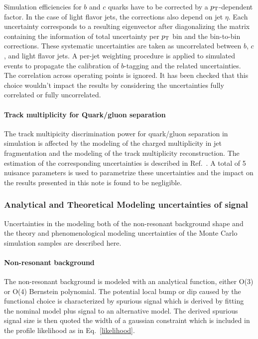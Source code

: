 Simulation efficiencies for $b$ and $c$ quarks have to be corrected by a
$p_{{\rm T}}$-dependent factor. In the case of light flavor jets, the corrections also 
depend on jet $\eta$. 
Each uncertainty corresponds to a resulting eigenvector after diagonalizing the matrix
containing the information of total uncertainty per $p_{{\rm T}}$ bin and the bin-to-bin 
corrections. These systematic
uncertainties are taken as uncorrelated between $b$, $c$, and light flavor jets.
A per-jet weighting procedure is applied to simulated events to propagate the 
calibration of $b$-tagging and the related uncertainties. 
The correlation across operating points is ignored. It has been checked that this choice
wouldn't impact the results by considering the uncertainties fully correlated or fully uncorrelated.


\paragraph{Track multiplicity for Quark/gluon separation}

The track multipicity discrimination power for quark/gluon separation in simulation 
is affected by the modeling of the charged multiplicity in jet fragmentation and the modeling of the
track multiplicity reconstruction. The estimation of the corresponding uncertainties is 
described in Ref.~\cite{qgtagging}. A total of 5 nuisance parameters is used to parametrize these
uncertainties and the impact on the results presented in this note is found to be negligible.

\subsubsection{Analytical and Theoretical Modeling uncertainties of signal}
\label{sec:syst_model}

Uncertainties in the modeling both of the non-resonant background shape and the theory and phenomenological modeling uncertainties of the Monte Carlo simulation samples are described here.


\paragraph{Non-resonant background}
The non-resonant background is modeled with an analytical function, either O(3) or O(4) Bernstein polynomial. 
The potential local bump or dip caused by the functional choice is characterized by spurious signal 
which is derived by fitting the nominal model plus signal to an alternative model. The derived spurious signal 
size is then quoted the width of a gaussian constraint which is included in the profile likelihood as in 
Eq.~\ref{likelihood}.

